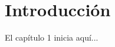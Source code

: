 %
%
\let\textcircled=\pgftextcircled
\chapter{Introducci\'on}
\label{Chapter1}


El cap\'itulo 1 inicia aqu\'i...